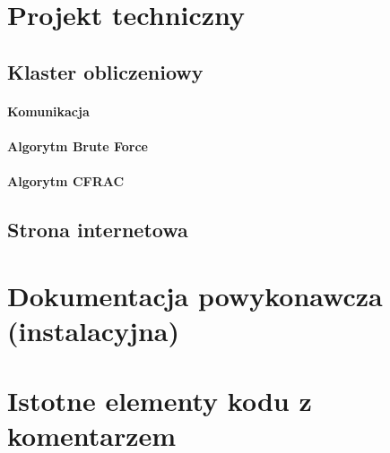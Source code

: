 \documentclass{article}
\begin{document}




\section{Projekt techniczny}

\subsection{Klaster obliczeniowy}

\paragraph{Komunikacja}

\paragraph{Algorytm Brute Force}

\paragraph{Algorytm CFRAC}

\subsection{Strona internetowa}

\section{Dokumentacja powykonawcza (instalacyjna)}

\section{Istotne elementy kodu z komentarzem}
\end{document}
